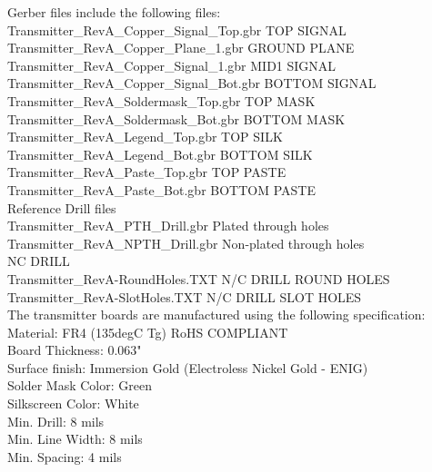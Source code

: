 \documentclass[12pt]{article}
\begin{document}
\noindent
Gerber files include the following files:\\
Transmitter\_RevA\_Copper\_Signal\_Top.gbr          	\indent\space	TOP SIGNAL\\
Transmitter\_RevA\_Copper\_Plane\_1.gbr               	\indent\indent\space	GROUND PLANE\\
Transmitter\_RevA\_Copper\_Signal\_1.gbr  	        	\indent\indent	MID1 SIGNAL\\
Transmitter\_RevA\_Copper\_Signal\_Bot.gbr           	\indent\space	BOTTOM SIGNAL\\
Transmitter\_RevA\_Soldermask\_Top.gbr  	        	\indent\indent	TOP MASK\\
Transmitter\_RevA\_Soldermask\_Bot.gbr   	        	\indent\indent	BOTTOM MASK\\
Transmitter\_RevA\_Legend\_Top.gbr          	        	\indent\indent\indent\space	TOP SILK\\
Transmitter\_RevA\_Legend\_Bot.gbr           	        	\indent\indent\indent\space	BOTTOM SILK\\
Transmitter\_RevA\_Paste\_Top.gbr             	        	\indent\indent\indent\space\space\space	TOP PASTE\\
Transmitter\_RevA\_Paste\_Bot.gbr             	        	\indent\indent\indent\space\space\space	BOTTOM PASTE\\
 
\noindent
Reference Drill files\\
Transmitter\_RevA\_PTH\_Drill.gbr              	        	\indent\indent\indent\space\space	Plated through holes\\
Transmitter\_RevA\_NPTH\_Drill.gbr            	        	\indent\indent\indent	Non-plated through holes\\
 
 \noindent
NC DRILL\\
Transmitter\_RevA-RoundHoles.TXT         	        	\indent\indent\indent	N/C DRILL ROUND HOLES\\
Transmitter\_RevA-SlotHoles.TXT              	        	\indent\indent\indent\space\space\space	N/C DRILL SLOT HOLES\\
 
 \noindent
The transmitter boards are manufactured using the following specification:\\
 
 \noindent
Material: FR4 (135degC Tg) RoHS COMPLIANT\\
Board Thickness: 0.063"\\
Surface finish: Immersion Gold (Electroless Nickel Gold - ENIG)\\
Solder Mask Color: Green\\
Silkscreen Color: White\\
Min. Drill: 8 mils\\
Min. Line Width: 8 mils\\
Min. Spacing: 4 mils
\end{document}
